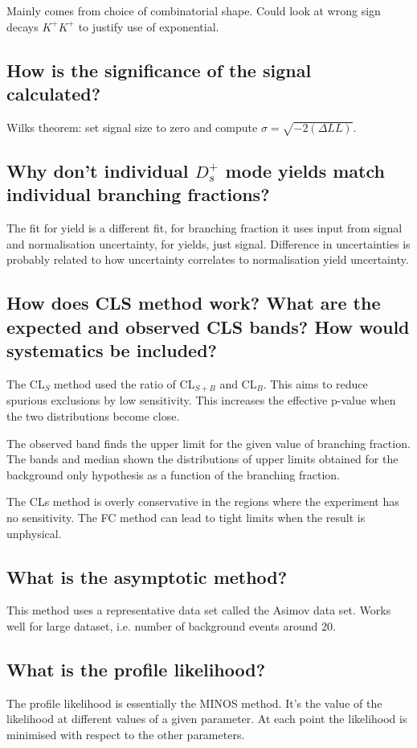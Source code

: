 \documentclass[12pt]{article}
\begin{document}
Mainly comes from choice of combinatorial shape. Could look at wrong sign decays $K^+K^+$ to justify use of exponential. 

\subsection{How is the significance of the signal calculated?}
Wilks theorem: set signal size to zero and compute $\sigma = \sqrt{-2(\Delta LL)}$.

\subsection{Why don't individual $D_{s}^{+}$ mode yields match individual branching fractions?}

The fit for yield is a different fit, for branching fraction it uses input from signal and normalisation uncertainty, for yields, just signal. Difference in uncertainties is probably related to how uncertainty correlates to normalisation yield uncertainty.


\subsection{How does CLS method work? What are the expected and observed CLS bands? How would systematics be included?}

The CL$_S$ method used the ratio of CL$_{S+B}$ and CL$_{B}$. This aims to reduce spurious exclusions by low sensitivity. This increases the effective p-value when the two distributions become close. 

The observed band finds the upper limit for the given value of branching fraction.
The bands and median shown the distributions of upper limits obtained for the background only hypothesis as a function of the branching fraction. 

The CLs method is overly conservative in the regions where the experiment has no sensitivity. The FC method can lead to tight limits when the result is unphysical.

\subsection{What is the asymptotic method?}
This method uses a representative data set called the Asimov data set. Works well for large dataset, i.e. number of background events around 20. 

\subsection{What is the profile likelihood?}
The profile likelihood is essentially the MINOS method. It's the value of the likelihood at different values of a given parameter. At each point the likelihood is minimised with respect to the other parameters. 
\end{document}
